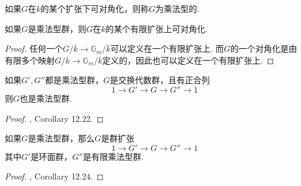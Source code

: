 \begin{cdef}
    如果$G$在$k$的某个扩张下可对角化，则称$G$为乘法型的.
\end{cdef}

\begin{cprop}
    如果$G$是乘法型群，则$G$在$k$的某个有限扩张上可对角化.
\end{cprop}

\begin{proof}
    任何一个$G/\overline{k}\to \mathbb{G}_m/\overline{k}$可以定义在一个有限扩张上. 而$G$的一个对角化是由有限多个映射$G/\overline{k}\to \mathbb{G}_m/\overline{k}$定义的，因此也可以定义在一个有限扩张上.
\end{proof}

\begin{cprop}
    如果$G',G''$都是乘法型群，$G$是交换代数群，且有正合列
    \begin{equation}
        1\to G'\to G\to G''\to 1
    \end{equation}
    则$G$也是乘法型群.
\end{cprop}

\begin{proof}
    \cite{milne2017algebraic}, Corollary 12.22.
\end{proof}

\begin{cprop}
    如果$G$是乘法型群，那么$G$是群扩张
    \begin{equation}
        1\to G'\to G\to G''\to 1
    \end{equation}
    其中$G'$是环面群，$G''$是有限乘法型群.
\end{cprop}

\begin{proof}
    \cite{milne2017algebraic}, Corollary 12.24.
\end{proof}
